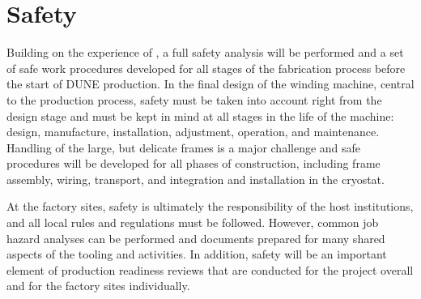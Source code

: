 \section{Safety}
\label{sec:fdsp-apa-safety}

Building on the experience of , a full safety analysis will be performed and a set of safe work procedures developed for all stages of the fabrication process before the start of DUNE  production.  In the final design of the winding machine, central to the production process, safety must be taken into account right from the design stage and must be kept in mind at all stages in the life of the machine: design, manufacture, installation, adjustment, operation, and maintenance.  Handling of the large, but delicate frames is a major challenge and safe procedures will be developed for all phases of construction, including frame assembly, wiring, transport, and integration and installation in the cryostat.         

At the factory sites, safety is ultimately the responsibility of the host institutions, and all local rules and regulations must be followed.  However, common job hazard analyses can be performed and documents prepared for many shared aspects of the tooling and activities.  In addition, safety will be an important element of production readiness reviews that are conducted for the project overall and for the factory sites individually.   
